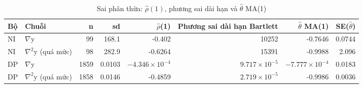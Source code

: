 \begin{table}[H]
\centering\footnotesize
\caption{Sai phân thừa: $\hat\rho(1)$, phương sai dài hạn và $\hat\theta$ MA(1)}\label{tab:tab_b12_03_overdifferencing}
\begin{adjustbox}{max width=\linewidth}
\begin{tabular}{|l|l|r|r|r|r|r|r|}
\toprule
Bộ & Chuỗi & n & sd & $\hat{\rho}$(1) & Phương sai dài hạn Bartlett & $\hat{\theta}$ MA(1) & SE($\hat{\theta}$) \\
\midrule
NI & $\nabla$y & 99 & 168.1 & -0.402 & 10252 & -0.7646 & 0.0744 \\
NI & $\nabla^{2}$y (quá mức) & 98 & 282.9 & -0.6264 & 15391 & -0.9988 & 2.096 \\
DP & $\nabla$y & 1859 & 0.0103 & $-4.346\times10^{-4}$ & $9.717\times10^{-5}$ & $-7.777\times10^{-4}$ & 0.0183 \\
DP & $\nabla^{2}$y (quá mức) & 1858 & 0.0146 & -0.4859 & $2.719\times10^{-5}$ & -0.9986 & 0.0036 \\
\bottomrule
\end{tabular}
\end{adjustbox}\par{}
\end{table}
